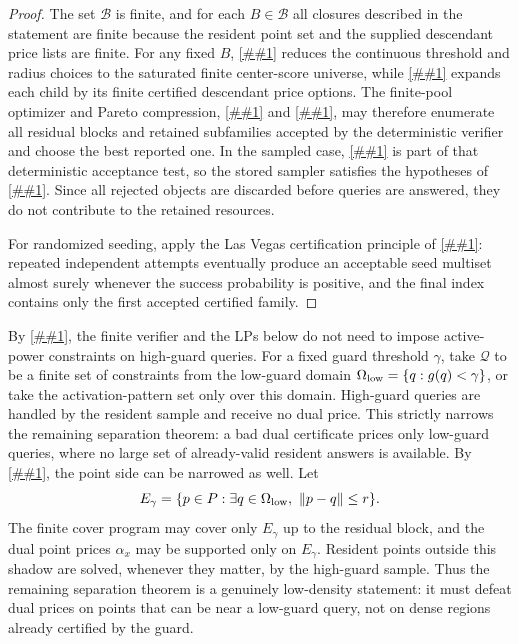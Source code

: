 \documentclass[10pt]{article}
\newcommand{\cref}[1]{\ref{##1}}
\theoremstyle{definition}
\begin{document}
\begin{proof}
   The set $\mathcal B$ is finite, and for each $B\in\mathcal B$ all closures
   described in the statement are finite because the resident point set and the
   supplied descendant price lists are finite.  For any fixed $B$,
   \cref{cor:offline-center-score-saturation} reduces the continuous threshold
   and radius choices to the saturated finite center-score universe, while
   \cref{cor:offline-recursive-pareto-pricing} expands each child by its finite
   certified descendant price options.  The finite-pool optimizer and Pareto
   compression, \cref{lem:finite-pool-optimizer} and
   \cref{cor:offline-pareto-compression}, may therefore enumerate all residual
   blocks and retained subfamilies accepted by the deterministic verifier and
   choose the best reported one.  In the sampled case,
   \cref{lem:finite-sampled-route-verifier} is part of that deterministic
   acceptance test, so the stored sampler satisfies the hypotheses of
   \cref{lem:sampled-priced-cover}.  Since all rejected objects are discarded
   before queries are answered, they do not contribute to the retained
   resources.

   For randomized seeding, apply the Las Vegas certification principle of
   \cref{lem:las-vegas-offline}: repeated independent attempts eventually
   produce an acceptable seed multiset almost surely whenever the success
   probability is positive, and the final index contains only the first
   accepted certified family.
\end{proof}

By \cref{lem:guard-restricted-cover}, the finite verifier and the LPs below do
not need to impose active-power constraints on high-guard queries.  For a fixed
guard threshold $\gamma$, take $\mathcal Q$ to be a finite set of constraints
from the low-guard domain $\Omega_{\rm low}=\{q:g(q)<\gamma\}$, or take the
activation-pattern set only over this domain.  High-guard queries are handled
by the resident sample and receive no dual price.  This strictly narrows the
remaining separation theorem: a bad dual certificate prices only low-guard
queries, where no large set of already-valid resident answers is available.
By \cref{lem:low-guard-shadow}, the point side can be narrowed as well.  Let
\[
   E_\gamma=\{p\in P:\exists q\in\Omega_{\rm low},\ \|p-q\|\le r\}.
\]
The finite cover program may cover only $E_\gamma$ up to the residual block,
and the dual point prices $\alpha_x$ may be supported only on $E_\gamma$.
Resident points outside this shadow are solved, whenever they matter, by the
high-guard sample.  Thus the remaining separation theorem is a genuinely
low-density statement: it must defeat dual prices on points that can be near a
low-guard query, not on dense regions already certified by the guard.
\end{document}
